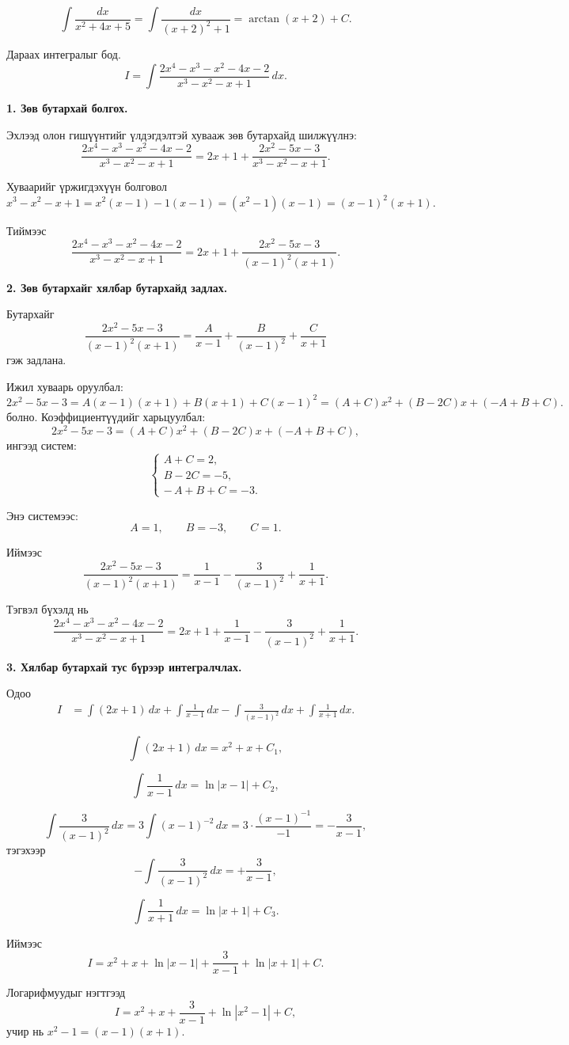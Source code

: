 \begin{example}
 \[
\int \frac{dx}{x^2+4x+5}
=
\int \frac{dx}{(x+2)^2+1}
=
\arctan(x+2)+C.
\]   
\end{example}
\begin{example}
Дараах интегралыг бод.
\[
I=\int\dfrac{2x^4 - x^3 - x^2 - 4x - 2}{x^3-x^2-x+1}\, dx.
\]

\textbf{1. Зөв бутархай болгох.}

Эхлээд олон гишүүнтийг үлдэгдэлтэй  хувааж зөв бутархайд шилжүүлнэ:
\[
\frac{2x^4 - x^3 - x^2 - 4x - 2}{x^3 - x^2 - x + 1}
= 2x+1 + \frac{2x^2 - 5x - 3}{x^3 - x^2 - x + 1}.
\]

Хуваарийг үржигдэхүүн болговол
\[
x^3 - x^2 - x + 1 
= x^2(x-1) -1(x-1)
= (x^2-1)(x-1)
= (x-1)^2(x+1).
\]

Тиймээс
\[
\frac{2x^4 - x^3 - x^2 - 4x - 2}{x^3 - x^2 - x + 1}
= 2x+1 + \frac{2x^2 - 5x - 3}{(x-1)^2(x+1)}.
\]


\textbf{2. Зөв бутархайг хялбар бутархайд задлах.}

Бутархайг
\[
\frac{2x^2 - 5x - 3}{(x-1)^2(x+1)}
= \frac{A}{x-1} + \frac{B}{(x-1)^2} + \frac{C}{x+1}
\]
гэж задлана.

Ижил хуваарь оруулбал:
\[
2x^2 - 5x - 3 
= A(x-1)(x+1) + B(x+1) + C(x-1)^2
= (A+C)x^2 + (B-2C)x + (-A+B+C).
\]
болно.
Коэффициентүүдийг харьцуулбал:
\[
2x^2 - 5x - 3 = (A+C)x^2 + (B-2C)x + (-A+B+C),
\]
ингээд систем:
\[
\begin{cases}
A + C = 2,\\
B - 2C = -5,\\
-\,A + B + C = -3.
\end{cases}
\]

Энэ системээс:
\[
A = 1,\qquad B = -3,\qquad C = 1.
\]

Иймээс
\[
\frac{2x^2 - 5x - 3}{(x-1)^2(x+1)}
= \frac{1}{x-1} - \frac{3}{(x-1)^2} + \frac{1}{x+1}.
\]

Тэгвэл бүхэлд нь
\[
\dfrac{2x^4 - x^3 - x^2 - 4x - 2}{x^3 - x^2 - x + 1}
= 2x+1 + \frac{1}{x-1} - \frac{3}{(x-1)^2} + \frac{1}{x+1}.
\]

\textbf{3. Хялбар бутархай тус бүрээр интегралчлах.}

Одоо
\[
\begin{aligned}
I
&= \int (2x+1)\,dx 
+ \int \frac{1}{x-1}\,dx 
- \int \frac{3}{(x-1)^2}\,dx 
+ \int\frac{1}{x+1}\,dx.
\end{aligned}
\]

\[
\int (2x+1)\,dx = x^2 + x + C_1,
\]

\[
\int\frac{1}{x-1}\,dx = \ln|x-1| + C_2,
\]

\[
\int \frac{3}{(x-1)^2}\,dx 
= 3\int (x-1)^{-2}\,dx 
= 3\cdot\frac{(x-1)^{-1}}{-1} 
= -\frac{3}{x-1},
\]
тэгэхээр
\[
-\int \frac{3}{(x-1)^2}\,dx = +\frac{3}{x-1},
\]

\[
\int\frac{1}{x+1}\,dx = \ln|x+1| + C_3.
\]

Иймээс
\[
I
= x^2 + x + \ln|x-1| + \frac{3}{x-1} + \ln|x+1| + C.
\]

Логарифмуудыг нэгтгээд
\[
I
= x^2 + x + \frac{3}{x-1} + \ln|x^2-1| + C,
\]
учир нь $x^2-1=(x-1)(x+1)$.

\end{example}
